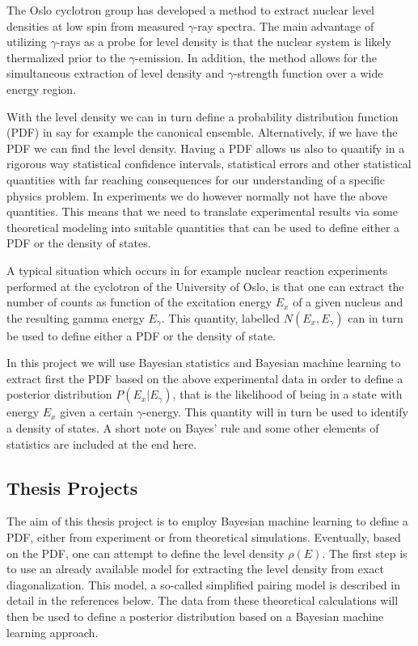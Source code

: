 \documentclass[%
oneside,                 %
final,                   %
10pt]{article}
\begin{document}
The Oslo cyclotron group has developed a method to extract nuclear
level densities at low spin from measured $\gamma$-ray spectra.  The
main advantage of utilizing $\gamma$-rays as a probe for level density
is that the nuclear system is likely thermalized prior to the
$\gamma$-emission. In addition, the method allows for the simultaneous
extraction of level density and $\gamma$-strength function over a wide
energy region.


With the level density we can in turn define a probability
distribution function (PDF) in say for example the canonical
ensemble. Alternatively, if we have the PDF we can find the level
density.  Having a PDF allows us also to quantify in a rigorous way
statistical confidence intervals, statistical errors and other
statistical quantities with far reaching consequences for our
understanding of a specific physics problem.  In experiments we do
however normally not have the above quantities. This means that we
need to translate experimental results via some theoretical modeling
into suitable quantities that can be used to define either a PDF or
the density of states.

A typical situation which occurs in for example nuclear reaction
experiments performed at the cyclotron of the University of Oslo, is
that one can extract the number of counts as function of the
excitation energy $E_x$ of a given nucleus and the resulting gamma
energy $E_{\gamma}$. This quantity, labelled
$N(E_x,E_{\gamma})$ can in turn be used to define either a PDF or the
density of state.


In this project we will use Bayesian statistics and Bayesian machine
learning to extract first the PDF based on the above experimental data
in order to define a posterior distribution $P(E_x\vert E_{\gamma})$,
that is the likelihood of being in a state with energy $E_x$ given a
certain $\gamma$-energy.  This quantity will in turn be used to
identify a density of states. A short note on Bayes' rule and some
other elements of statistics are included at the end here.


\subsection*{Thesis Projects}

The aim of this thesis project is to employ Bayesian machine learning to
define a PDF, either from experiment or from theoretical simulations.
Eventually, based on the PDF, one can attempt to define the level density
$\rho(E)$. The first step is to use an
already available model for extracting the level density from exact
diagonalization. This model, a so-called simplified pairing model is
described in detail in the references below.
The 
data from these theoretical calculations
will then be used to define a posterior distribution based on a
Bayesian machine learning approach.
\end{document}
